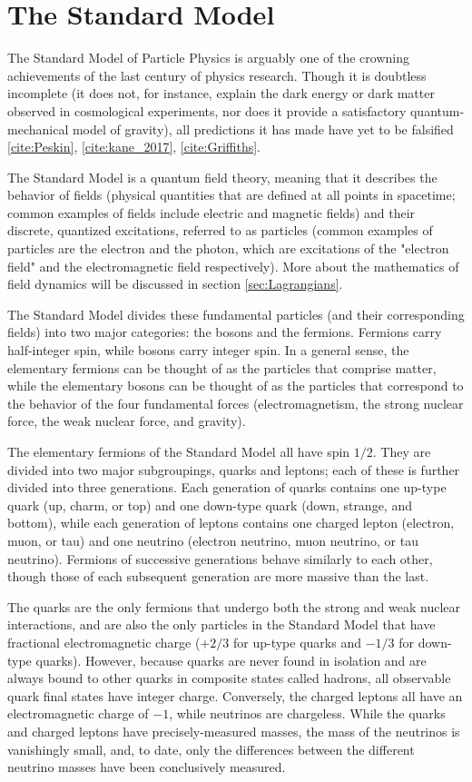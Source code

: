 \section{The Standard Model} \label{sec:SM} 

The Standard Model of Particle Physics is arguably one of the crowning achievements of the last century of physics research. Though it is doubtless incomplete (it does not, for instance, explain the dark energy or dark matter observed in cosmological experiments, nor does it provide a satisfactory quantum-mechanical model of gravity), all predictions it has made have yet to be falsified \ref{cite:Peskin}, \ref{cite:kane_2017}, \ref{cite:Griffiths}.

The Standard Model is a quantum field theory, meaning that it describes the behavior of fields (physical quantities that are defined at all points in spacetime; common examples of fields include electric and magnetic fields) and their discrete, quantized excitations, referred to as particles (common examples of particles are the electron and the photon, which are excitations of the "electron field" and the electromagnetic field respectively). More about the mathematics of field dynamics will be discussed in section \ref{sec:Lagrangians}.

The Standard Model divides these fundamental particles (and their corresponding fields) into two major categories: the bosons and the fermions. Fermions carry half-integer spin, while bosons carry integer spin. In a general sense, the elementary fermions can be thought of as the particles that comprise matter, while the elementary bosons can be thought of as the particles that correspond to the behavior of the four fundamental forces (electromagnetism, the strong nuclear force, the weak nuclear force, and gravity).

The elementary fermions of the Standard Model all have spin $1/2$. They are divided into two major subgroupings, quarks and leptons; each of these is further divided into three generations. Each generation of quarks contains one up-type quark (up, charm, or top) and one down-type quark (down, strange, and bottom), while each generation of leptons contains one charged lepton (electron, muon, or tau) and one neutrino (electron neutrino, muon neutrino, or tau neutrino). Fermions of successive generations behave similarly to each other, though those of each subsequent generation are more massive than the last.

The quarks are the only fermions that undergo both the strong and weak nuclear interactions, and are also the only particles in the Standard Model that have fractional electromagnetic charge ($+2/3$ for up-type quarks and $-1/3$ for down-type quarks). However, because quarks are never found in isolation and are always bound to other quarks in composite states called hadrons, all observable quark final states have integer charge. Conversely, the charged leptons all have an electromagnetic charge of $-1$, while neutrinos are chargeless. While the quarks and charged leptons have precisely-measured masses, the mass of the neutrinos is vanishingly small, and, to date, only the differences between the different neutrino masses have been conclusively measured.

